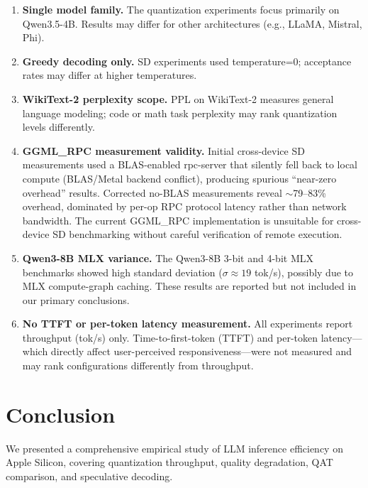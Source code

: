 \documentclass[11pt,a4paper]{article}
\begin{document}
\begin{enumerate}
  \item \textbf{Single model family.} The quantization experiments focus
    primarily on Qwen3.5-4B. Results may differ for other architectures
    (e.g., LLaMA, Mistral, Phi).
  \item \textbf{Greedy decoding only.} SD experiments used temperature=0;
    acceptance rates may differ at higher temperatures.
  \item \textbf{WikiText-2 perplexity scope.} PPL on WikiText-2 measures
    general language modeling; code or math task perplexity may rank
    quantization levels differently.
  \item \textbf{GGML\_RPC measurement validity.} Initial cross-device SD
    measurements used a BLAS-enabled rpc-server that silently fell back to local
    compute (BLAS/Metal backend conflict), producing spurious ``near-zero overhead''
    results. Corrected no-BLAS measurements reveal $\sim$79--83\% overhead,
    dominated by per-op RPC protocol latency rather than network bandwidth.
    The current GGML\_RPC implementation is unsuitable for cross-device SD
    benchmarking without careful verification of remote execution.
  \item \textbf{Qwen3-8B MLX variance.} The Qwen3-8B 3-bit and 4-bit MLX
    benchmarks showed high standard deviation ($\sigma \approx 19$ tok/s),
    possibly due to MLX compute-graph caching. These results are reported but
    not included in our primary conclusions.
  \item \textbf{No TTFT or per-token latency measurement.} All experiments
    report throughput (tok/s) only. Time-to-first-token (TTFT) and per-token
    latency---which directly affect user-perceived responsiveness---were not
    measured and may rank configurations differently from throughput.
\end{enumerate}

\section{Conclusion}

We presented a comprehensive empirical study of LLM inference efficiency on
Apple Silicon, covering quantization throughput, quality degradation, QAT
comparison, and speculative decoding.
\end{document}
